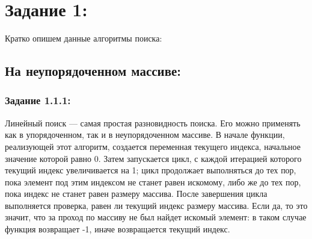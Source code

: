 \documentclass[12pt]{article}
\begin{document}
	\tableofcontents
	\newpage
	
	\section{Задание 1:}
	\label{task_1}
	Кратко опишем данные алгоритмы поиска:
	
	\subsection{На неупорядоченном массиве:}
	\label{task_1_1}
	\subsubsection{Задание 1.1.1:}
	\label{task_1_1_1}
	
	Линейный поиск --- самая простая разновидность поиска. Его можно применять как в упорядоченном, так и в неупорядоченном массиве. В начале функции, реализующей этот алгоритм, создается переменная текущего индекса, начальное значение которой равно 0. Затем запускается цикл, с каждой итерацией которого текущий индекс увеличивается на 1; цикл продолжает выполняться до тех пор, пока элемент под этим индексом не станет равен искомому, либо же до тех пор, пока индекс не станет равен размеру массива. После завершения цикла выполняется проверка, равен ли текущий индекс размеру массива. Если да, то это значит, что за проход по массиву не был найдет искомый элемент: в таком случае функция возвращает -1, иначе возвращается текущий индекс. 
	
	 
	
\end{document}
